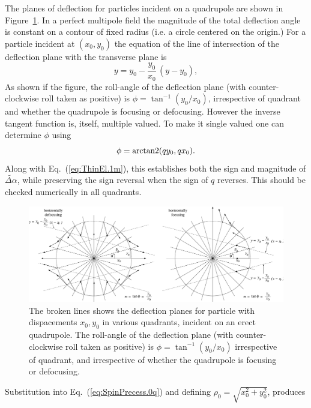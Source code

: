 \documentclass[]{article}
\begin{document}
The planes of deflection for particles incident on a
quadrupole are shown in Figure~\ref{fig:QuadRotatPlanes}.
In a perfect multipole field the magnitude of the 
total deflection angle
is constant on a contour of fixed radius (i.e. a circle
centered on the origin.) For a particle incident at 
$(x_0,y_0)$ the equation of the line of intersection
of the deflection plane with the transverse plane is
%
\begin{equation}
y = y_0 - \frac{y_0}{x_0}\,(y-y_0),
\label{eq:ThinEl.2}
\end{equation}
%
As shown if the figure, the roll-angle of the deflection plane
(with counter-clockwise roll taken as positive)
is $\phi=\tan^{-1}(y_0/x_0)$,
irrespective of quadrant and whether the quadrupole is
focusing or defocusing. However the inverse tangent function
is, itself, multiple valued. To make it single valued one can
determine $\phi$ using
%
\begin{equation}
\phi={\rm arctan2}(qy_0,qx_0).
\label{eq:ThinEl.3}
\end{equation}
%
Along with Eq.~(\ref{eq:ThinEl.1m}), this establishes
both the sign and magnitude of $\widetilde{\Delta\alpha}$,
while preserving the sign reversal when the sign of $q$ reverses.
This should be checked numerically in all quadrants.
%
\begin{figure}[h]
\centering
\includegraphics[scale=0.26]{xfig/QuadRotatPlanes.eps}
\caption{\label{fig:QuadRotatPlanes}The broken lines
shows the deflection planes for particle with
dispacements $x_0,y_0$ in various quadrants, incident 
on an erect quadrupole.  The roll-angle of the deflection plane
(with counter-clockwise roll taken as positive)
is $\phi=\tan^{-1}(y_0/x_0)$ irrespective of quadrant,
and irrespective of whether the quadrupole is
focusing or defocusing.}
\end{figure}
%
Substitution into Eq.~(\ref{eq:SpinPrecess.0q}) and
defining $\rho_0=\sqrt{x_0^2+y_0^2}$, produces
%
\end{document}

